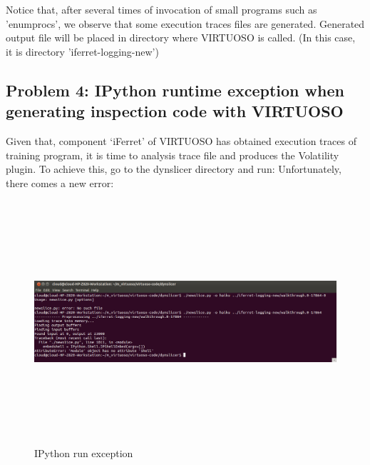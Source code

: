 Notice that, after several times of invocation of small programs such as 'enumprocs', we observe that some execution traces files are 
generated.  Generated output file will be placed in directory where VIRTUOSO is called. (In this case, it is directory 'iferret-logging-new')

\subsection{Problem 4: IPython runtime exception when generating inspection code with VIRTUOSO}
Given that, component ‘iFerret’ of VIRTUOSO has obtained execution traces of training program, it is time to analysis trace file and 
produces the Volatility plugin. To achieve this, go to the dynslicer directory and run:
Unfortunately, there comes a new error:

\begin{figure}[htbp]
	\centering
		\includegraphics[width=14cm, height= 9cm ]{Figures/Figure37.png}
	\caption[IPython run exception]{IPython run exception}
	\label{fig:IPython run exception}
\end{figure}

